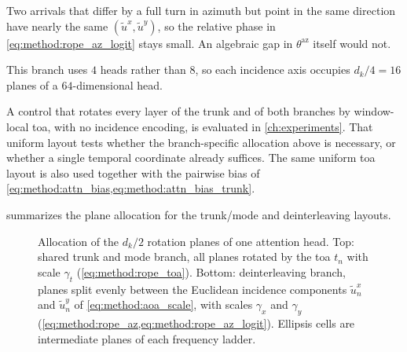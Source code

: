 Two arrivals that differ by a full turn in azimuth but point in the same direction have nearly the same $(\tilde{u}^{x},\tilde{u}^{y})$, so the relative phase in \cref{eq:method:rope_az_logit} stays small.
An algebraic gap in $\theta^{\mathrm{az}}$ itself would not.

This branch uses $4$ heads rather than $8$, so each incidence axis occupies $d_k/4 = 16$ planes of a $64$-dimensional head.

A control that rotates every layer of the trunk and of both branches by window-local \gls{toa}, with no incidence encoding, is evaluated in \cref{ch:experiments}.
That uniform layout tests whether the branch-specific allocation above is necessary, or whether a single temporal coordinate already suffices.
The same uniform \gls{toa} layout is also used together with the pairwise bias of \cref{eq:method:attn_bias,eq:method:attn_bias_trunk}.

 summarizes the plane allocation for the trunk/mode and deinterleaving layouts.

\begin{figure}[tbp]
  \centering
  
  \caption{Allocation of the $d_k/2$ rotation planes of one attention head. Top: shared trunk and mode branch, all planes rotated by the \gls{toa} $t_n$ with scale $\gamma_t$ (\cref{eq:method:rope_toa}). Bottom: deinterleaving branch, planes split evenly between the Euclidean incidence components $\tilde{u}^{x}_n$ and $\tilde{u}^{y}_n$ of \cref{eq:method:aoa_scale}, with scales $\gamma_x$ and $\gamma_y$ (\cref{eq:method:rope_az,eq:method:rope_az_logit}). Ellipsis cells are intermediate planes of each frequency ladder.}
  \label{fig:method:rope_slicing}
\end{figure}
